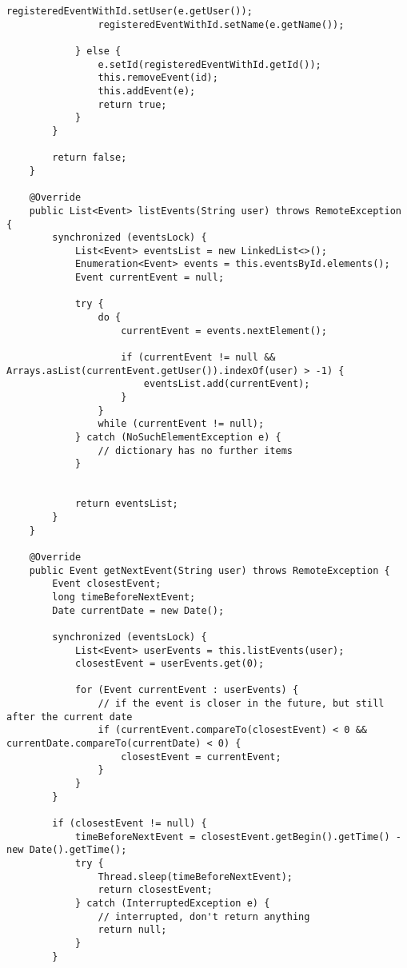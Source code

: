 \begin{lstlisting}[style=java]
                registeredEventWithId.setUser(e.getUser());
                registeredEventWithId.setName(e.getName());

            } else {
                e.setId(registeredEventWithId.getId());
                this.removeEvent(id);
                this.addEvent(e);
                return true;
            }
        }

        return false;
    }

    @Override
    public List<Event> listEvents(String user) throws RemoteException {
        synchronized (eventsLock) {
            List<Event> eventsList = new LinkedList<>();
            Enumeration<Event> events = this.eventsById.elements();
            Event currentEvent = null;

            try {
                do {
                    currentEvent = events.nextElement();

                    if (currentEvent != null && Arrays.asList(currentEvent.getUser()).indexOf(user) > -1) {
                        eventsList.add(currentEvent);
                    }
                }
                while (currentEvent != null);
            } catch (NoSuchElementException e) {
                // dictionary has no further items
            }


            return eventsList;
        }
    }

    @Override
    public Event getNextEvent(String user) throws RemoteException {
        Event closestEvent;
        long timeBeforeNextEvent;
        Date currentDate = new Date();

        synchronized (eventsLock) {
            List<Event> userEvents = this.listEvents(user);
            closestEvent = userEvents.get(0);

            for (Event currentEvent : userEvents) {
                // if the event is closer in the future, but still after the current date
                if (currentEvent.compareTo(closestEvent) < 0 && currentDate.compareTo(currentDate) < 0) {
                    closestEvent = currentEvent;
                }
            }
        }

        if (closestEvent != null) {
            timeBeforeNextEvent = closestEvent.getBegin().getTime() - new Date().getTime();
            try {
                Thread.sleep(timeBeforeNextEvent);
                return closestEvent;
            } catch (InterruptedException e) {
                // interrupted, don't return anything
                return null;
            }
        }


\end{lstlisting}
